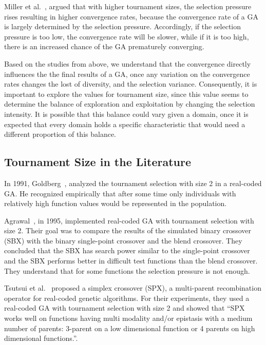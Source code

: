Miller et al.~\cite{miller1995genetic}, argued that with higher tournament sizes, the selection pressure rises resulting in higher convergence rates, because the convergence rate of a GA is largely determined by the selection pressure.  Accordingly, if the selection pressure is too low, the convergence rate will be slower, while if it is too high, there is an increased chance of the GA prematurely converging.

Based on the studies from above, we understand that the convergence directly influences the the final results of a GA, once any variation on the convergence rates changes the lost of diversity, and the selection variance. Consequently, it is important to explore the values for tournament size, since this value seems to determine the balance of exploration and exploitation by changing the selection intensity. It is possible that this balance could vary given a domain, once it is expected that every domain holds a specific characteristic that would need a different proportion of this balance.

\subsection{Tournament Size in the Literature}\label{sec:background:tournament_size} 

In 1991, Goldberg~\cite{goldberg1991real}, analyzed the tournament selection with size 2 in a real-coded GA. He recognized empirically that after some time only individuals with relatively high function values would be represented in the population.%

Agrawal~\cite{agrawal1995simulated}, in 1995, implemented real-coded GA with tournament selection with size 2. Their goal was to compare the results of the simulated binary crossover (SBX) with the binary single-point crossover and the blend crossover. They concluded that the SBX has search power similar to the single-point crossover and the SBX performs better in difficult test functions than the blend crossover. They understand that for some functions the selection pressure is not enough.

Tsutsui et al.~\cite{tsutsui1999multi} proposed a simplex crossover (SPX), a multi-parent recombination operator for real-coded genetic algorithms. For their experiments, they used a real-coded GA with tournament selection with size 2 and showed that ``SPX works well on functions having multi modality and/or epistasis with a medium number of parents: 3-parent on a low dimensional function or 4 parents on high dimensional functions.''. 

